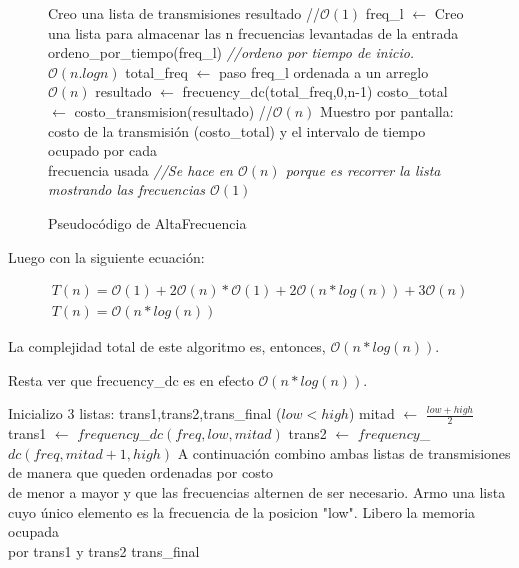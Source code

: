 \begin{figure}[!ht]
\begin{codebox}
\li Creo una lista de transmisiones resultado  //$\mathcal{O}(1)$ 
\li freq_l $\leftarrow$ Creo una lista para almacenar las n frecuencias levantadas de la entrada
\li ordeno_por_tiempo(freq_l) {\it //ordeno por tiempo de inicio. $\mathcal{O}(n.logn)$}
\li total_freq $\leftarrow$ paso freq_l ordenada a un arreglo $\mathcal{O}(n)$
\li resultado $\leftarrow$ frecuency_dc(total_freq,0,n-1)
\li costo_total $\leftarrow$ costo_transmision(resultado) //$\mathcal{O}(n)$
\li Muestro por pantalla: costo de la transmisión (costo_total) y el intervalo de tiempo ocupado por cada\\ frecuencia usada {\it //Se hace en $\mathcal{O}(n)$ porque es recorrer la lista mostrando las frecuencias $\mathcal{O}(1)$}
\end{codebox}
\caption{Pseudocódigo de AltaFrecuencia}\label{code:altafrec}
\end{figure}
\FloatBarrier

Luego con la siguiente ecuación:

\begin{equation*}
\begin{array}{l}
T(n) = \mathcal{O}(1) + 2\mathcal{O}(n)*\mathcal{O}(1) + 2\mathcal{O}(n*log(n)) + 3\mathcal{O}(n)\\
T(n) = \mathcal{O}(n*log(n))
\end{array}
\end{equation*}

La complejidad total de este algoritmo es, entonces, $\mathcal{O}(n*log(n))$.

Resta ver que frecuency_dc es en efecto $\mathcal{O}(n*log(n))$.

\begin{codebox}
\li Inicializo 3 listas: trans1,trans2,trans_final
\li \If ($low<high$)
\li	\quad	mitad $\longleftarrow$ $\frac{low + high}{2}$
\li	\quad	trans1 $\longleftarrow$ $frequency$_$dc(freq,low,mitad)$
\li	\quad	trans2 $\longleftarrow$ $frequency$_$dc(freq,mitad+1,high)$
\li	\quad	A continuación combino ambas listas de transmisiones de manera que queden ordenadas por costo
\\ \quad de menor a mayor y que las frecuencias alternen de ser necesario.
\li \Else
\li \quad	Armo una lista cuyo único elemento es la frecuencia de la posicion "low". Libero la memoria ocupada\\ \quad por trans1 y trans2
\li \Return trans_final 
 \end{codebox}


